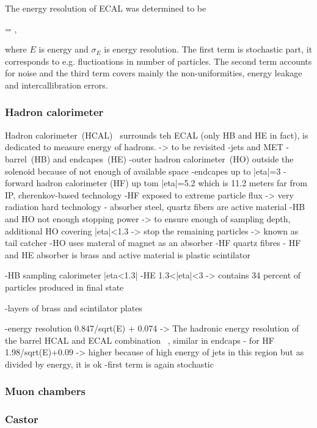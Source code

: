 The energy resolution of ECAL was determined to be

{
  =  \bigoplus {}  ,
}

where $E$ is energy and $\sigma_{E}$ is energy resolution. The first term is stochastic part, it corresponds to e.g. fluctioations in number of particles. The second term accounts for noise and the third term covers mainly the non-uniformities, energy leakage and intercallibration errors.


\subsubsection{Hadron calorimeter}

Hadron calorimeter~(HCAL)~\cite{tdrHCAL} surrounds teh ECAL  (only HB and HE in fact), is dedicated to measure energy of hadrons. -> to be revisited
-jets and MET
-barrel~(HB) and endcapes~(HE) 
-outer hadron calorimeter~(HO) outside the solenoid because of not enough of available space
-endcapes up to |eta|=3
- forward hadron calorimeter (HF) up tom |eta|=5.2 which is 11.2 meters far from IP, cherenkov-based technology
-HF exposed to extreme particle flux -> very radiation hard technology - absorber steel, quartz fibers are active material
-HB and HO not enough stopping power -> to ensure enough of sampling depth, additional HO covering |eta|<1.3 -> stop the remaining particles -> known as tail catcher
-HO uses materal of magnet as an absorber
-HF quartz fibres
- HF and HE absorber is brass and active material is plastic scintilator

-HB sampling calorimeter |eta<1.3|
-HE 1.3<|eta|<3 -> contains 34 percent of particles produced in final state

-layers of brass and scintilator plates

-energy resolution 0.847/sqrt(E) + 0.074 -> The hadronic energy resolution of the barrel HCAL and ECAL combination ~\cite{Chatrchyan:2009ag}, similar in endcaps
- for HF 1.98/sqrt(E)+0.09 -> higher because of high energy of jets in this region but as divided by energy, it is ok
-first term is again stochastic

\subsubsection{Muon chambers}
\subsubsection{Castor}
